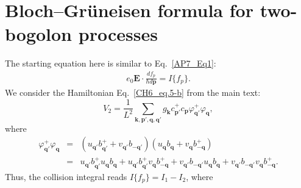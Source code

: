 \section{Bloch--Gr\"uneisen formula for two-bogolon processes}
The starting equation here is similar to Eq.~\eqref{AP7_Eq1}:
%
\begin{eqnarray}
\nonumber
e_0\mathbf{E}\cdot\frac{df_p}{\hbar d\mathbf{p}}=I\{f_p\}.
\end{eqnarray}
%
We consider the Hamiltonian
Eq.~\eqref{CH6_eq.5-b} from the main text:
%
\begin{equation}\label{1}
V_2=\frac{1}{L^2}\sum_{\mathbf{k},\mathbf{p}',\mathbf{q},\mathbf{q}'}
g_\textbf{k}
c^+_{\textbf{p}'}c_{\textbf{p}}\varphi^+_{\textbf{q}'}\varphi_{\textbf{q}},
\end{equation}
%
where
%
\begin{eqnarray}\label{AP7_2}
\varphi^+_{\textbf{q}'}\varphi_{\textbf{q}}&=&(u_{\textbf{q}'}b^+_{\textbf{q}'}+v_{\textbf{q}'}b_{-\textbf{q}'})
(u_{\textbf{q}}b_{\textbf{q}}+v_{\textbf{q}}b^+_{-\textbf{q}})\\ \nonumber
&=&u_{\textbf{q}'}b^+_{\textbf{q}'}u_{\textbf{q}}b_{\textbf{q}}+u_{\textbf{q}'}b^+_{\textbf{q}'}v_{\textbf{q}}b^+_{-\textbf{q}}+
v_{\textbf{q}'}b_{-\textbf{q}'}u_{\textbf{q}}b_{\textbf{q}}+v_{\textbf{q}'}b_{-\textbf{q}'}v_{\textbf{q}}b^+_{-\textbf{q}}.
\end{eqnarray}
%
Thus, the collision integral reads $I\{f_p\}=I_1-I_2$, where
%
